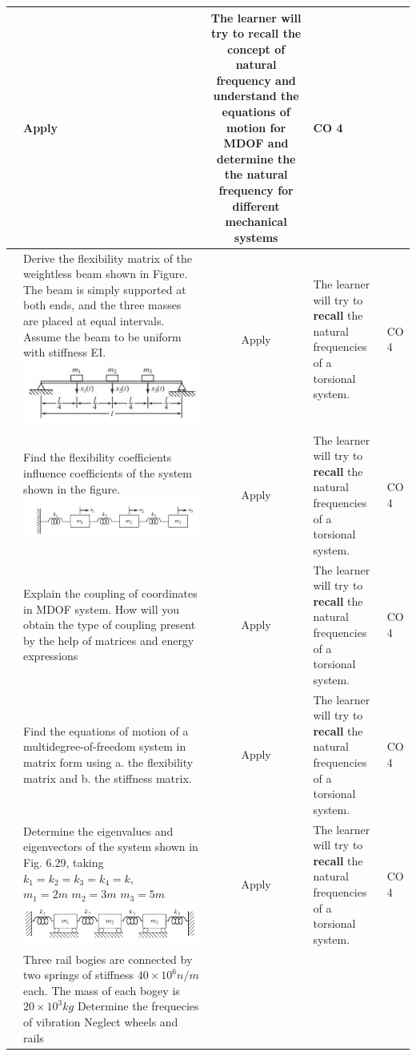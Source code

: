 \documentclass[11pt,paper=a4,answers]{exam}
\begin{document}
\begin{flushleft}
\begin{longtable}{|>{\centering\arraybackslash}p{0.8cm}  | >{\raggedright\arraybackslash}p{6.5cm}  | c | >{\raggedright\arraybackslash}p{5cm} |>{\centering\arraybackslash}p{1cm}|}
&	Apply&	The learner will try to recall the concept of natural frequency and understand the equations of motion for MDOF and determine the the natural frequency for different mechanical systems &	CO 4\\
	\hline 
	11&	Derive the flexibility matrix of the weightless beam shown in Figure. The beam is simply supported at both ends, and the three masses are placed at equal intervals. Assume the beam to be uniform with stiffness EI. 
	\includegraphics[scale=0.8]{16.jpg}
	&	Apply&	The learner will try to \textbf{recall} the natural frequencies of a torsional system. &	CO 4\\
	\hline
		12&	Find the flexibility coefficients influence coefficients of the system shown in the figure.
		\includegraphics[scale=0.6]{15.jpg}
	&	Apply&	The learner will try to \textbf{recall} the natural frequencies of a torsional system. &	CO 4\\
	\hline
		13&	Explain the coupling of coordinates in MDOF system. How will you obtain the type of coupling present by the help of matrices and energy expressions
	&	Apply&	The learner will try to \textbf{recall} the natural frequencies of a torsional system. &	CO 4\\
	\hline
	14&	Find the equations of motion of a multidegree-of-freedom system in matrix form using
	a. the flexibility matrix and
	b. the stiffness matrix.
	&	Apply&	The learner will try to \textbf{recall} the natural frequencies of a torsional system. &	CO 4\\
	\hline
		15&	Determine the eigenvalues and eigenvectors of the system shown in Fig. 6.29, taking $k_{1}=k_{2}=k_{3}=k_{4}=k$, $m_{1}=2m\,\,m_{2}=3m\,\,m_{3}=5m$
		\includegraphics[scale=0.4]{6.29.png}
	&	Apply&	The learner will try to \textbf{recall} the natural frequencies of a torsional system. &	CO 4\\
	\hline
	16&	Three rail bogies are connected by two springs of stiffness $40 \times 10^{6}n/m$ each. The mass of each bogey is $20\times 10^{3} kg$  Determine the frequecies of vibration Neglect wheels and rails
	

\end{longtable}
\end{flushleft}
\end{document}
